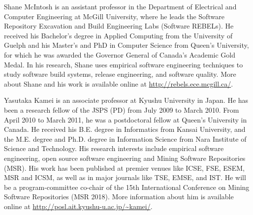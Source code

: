 \begin{IEEEbiography}{Shane McIntosh}
is an assistant professor in the Department of Electrical and Computer Engineering at McGill University, where he leads the Software Repository Excavation and Build Engineering Labs (Software REBELs). He received his Bachelor's degree in Applied Computing from the University of Guelph and his Master's and PhD in Computer Science from Queen's University, for which he was awarded the Governor General of Canada's Academic Gold Medal. In his research, Shane uses empirical software engineering techniques to study software build systems, release engineering, and software quality. More about Shane and his work is available online at \url{http://rebels.ece.mcgill.ca/}.
\end{IEEEbiography}

\begin{IEEEbiography}{Yasutaka Kamei}
is an associate professor at Kyushu University in Japan. He has been a research fellow of the JSPS (PD) from July 2009 to March 2010. From April 2010 to March 2011, he was a postdoctoral fellow at Queen’s University in Canada. He received his B.E. degree in Informatics from Kansai University, and the M.E. degree and Ph.D. degree in Information Science from Nara Institute of Science and Technology. His research interests include empirical software engineering, open source software engineering and Mining Software Repositories (MSR). His work has been published at premier venues like ICSE, FSE, ESEM, MSR and ICSM, as well as in major journals like TSE, EMSE, and IST. He will be a program-committee co-chair of the 15th International Conference on Mining Software Repositories (MSR 2018). More information about him is available online at \url{http://posl.ait.kyushu-u.ac.jp/~kamei/}.
\end{IEEEbiography}


